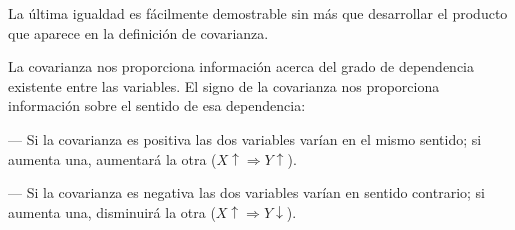 \textcolor{gris}{La última igualdad es fácilmente demostrable sin más que desarrollar el producto que aparece en la definición de covarianza.}

\begin{destacado}
La covarianza nos proporciona información acerca del grado de dependencia existente entre las variables. El signo de la covarianza nos proporciona información sobre el sentido de esa dependencia: 

--- Si la covarianza es positiva las dos variables varían en el mismo sentido; si aumenta una, aumentará la otra ($X\uparrow \Rightarrow Y\uparrow$).

--- Si la covarianza es negativa las dos variables varían en sentido contrario; si aumenta una, disminuirá la otra ($X\uparrow \Rightarrow Y\downarrow$).
\end{destacado}

